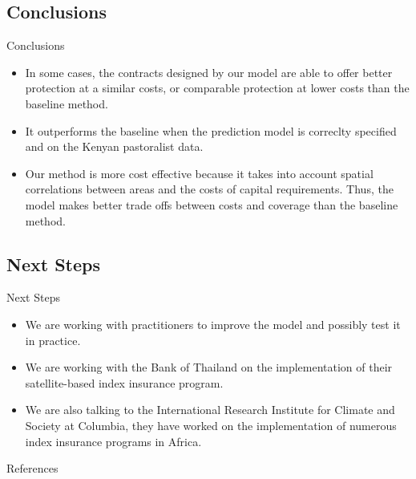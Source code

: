 \documentclass{beamer}
\begin{document}
\subsection{Conclusions}
\begin{frame}{Conclusions}
    \begin{itemize}
    \setlength\itemsep{2em}
        \item In some cases, the contracts designed by our model are able to offer better protection at a similar costs, or comparable protection at lower costs than the baseline method. 
        \item It outperforms the baseline when the prediction model is correclty specified and on the Kenyan pastoralist data. 
        \item Our method is more cost effective because it takes into account spatial correlations between  areas and the costs of capital requirements. Thus, the model makes better trade offs between costs and coverage than the baseline method. 
        
    \end{itemize}
\end{frame}

\subsection{Next Steps}
\begin{frame}{Next Steps}
\begin{itemize}
\setlength\itemsep{2em}
    \item We are working with practitioners to improve the model and possibly test it in practice.
    \item We are working with the Bank of Thailand on the implementation of their satellite-based index insurance program. 
    \item We are also talking to the International Research Institute for Climate and Society at Columbia, they have worked on the implementation of numerous index insurance programs in Africa.   
\end{itemize}
\end{frame}

\begin{frame}{References}
\printbibliography
\end{frame}
\end{document}
